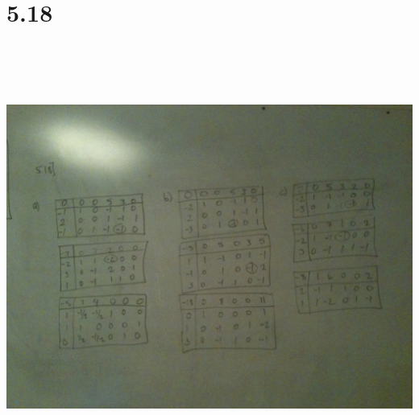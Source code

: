 \documentclass[a4paper,12pt]{article}
\begin{document}
\section*{5.18}
\includegraphics[width=14cm, height=14cm, keepaspectratio=true]{image/fiveeighteen.jpg}
\end{document}

